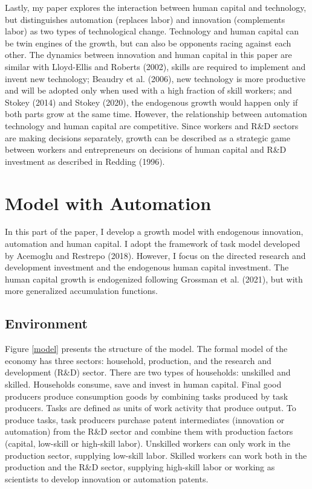 \documentclass[12pt]{article}
\begin{document}
Lastly, my paper explores the interaction between human capital and technology, but distinguishes automation (replaces labor) and innovation (complements labor) as two types of technological change. Technology and human capital can be twin engines of the growth, but can also be opponents racing against each other. The dynamics between innovation and human capital in this paper are similar with Lloyd-Ellis and Roberts (2002)\nocite{Lloyd-EllisRoberts2002}, skills are required to implement and invent new technology; Beaudry et al. (2006)\nocite{Beaudryetal2006}, new technology is more productive and will be adopted only when used with a high fraction of skill workers; and Stokey (2014)\nocite{Stokey2014} and Stokey (2020)\nocite{Stokey2020}, the endogenous growth would happen only if both parts grow at the same time. However, the relationship between automation technology and human capital are competitive. Since workers and R\&D sectors are making decisions separately, growth can be described as a strategic game between workers and entrepreneurs on decisions of human capital and R\&D investment as described in Redding (1996)\nocite{Redding1996}.


\section{Model with Automation}
In this part of the paper, I develop a growth model with endogenous innovation, automation and human capital. I adopt the framework of task model developed by Acemoglu and Restrepo (2018)\nocite{AcemogluRestrepo2018}. However, I focus on the directed research and development investment and the endogenous human capital investment. The human capital growth is endogenized following Grossman et al. (2021)\nocite{Grossmanetal2021}, but with more generalized accumulation functions. 

\subsection{Environment}
Figure \ref{model} presents the structure of the model. The formal model of the economy has three sectors: household, production, and the research and development (R\&D) sector. There are two types of households: unskilled and skilled. Households consume, save and invest in human capital. Final good producers produce consumption goods by combining tasks produced by task producers. Tasks are defined as units of work activity that produce output. To produce tasks, task producers purchase patent intermediates (innovation or automation) from the R\&D sector and combine them with production factors (capital, low-skill or high-skill labor). Unskilled workers can only work in the production sector, supplying low-skill labor. Skilled workers can work both in the production and the R\&D sector, supplying high-skill labor or working as scientists to develop innovation or automation patents. 
\end{document}
